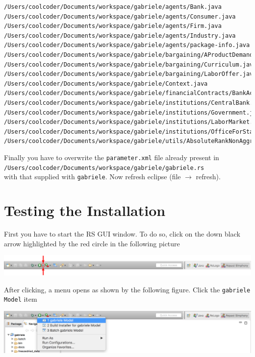 \documentclass{book}
\begin{document}
\begin{verbatim}
/Users/coolcoder/Documents/workspace/gabriele/agents/Bank.java
/Users/coolcoder/Documents/workspace/gabriele/agents/Consumer.java
/Users/coolcoder/Documents/workspace/gabriele/agents/Firm.java
/Users/coolcoder/Documents/workspace/gabriele/agents/Industry.java
/Users/coolcoder/Documents/workspace/gabriele/agents/package-info.java
/Users/coolcoder/Documents/workspace/gabriele/bargaining/AProductDemand.java
/Users/coolcoder/Documents/workspace/gabriele/bargaining/Curriculum.java
/Users/coolcoder/Documents/workspace/gabriele/bargaining/LaborOffer.java
/Users/coolcoder/Documents/workspace/gabriele/Context.java
/Users/coolcoder/Documents/workspace/gabriele/financialContracts/BankAccount.java
/Users/coolcoder/Documents/workspace/gabriele/institutions/CentralBank.java
/Users/coolcoder/Documents/workspace/gabriele/institutions/Government.java
/Users/coolcoder/Documents/workspace/gabriele/institutions/LaborMarket.java
/Users/coolcoder/Documents/workspace/gabriele/institutions/OfficeForStatistics.java
/Users/coolcoder/Documents/workspace/gabriele/utils/AbsoluteRankNonAggregateDataSource.java
\end{verbatim}

Finally you have to overwrite the \verb+parameter.xml+ file already present in\\  
\verb+/Users/coolcoder/Documents/workspace/gabriele/gabriele.rs+\\
with that supplied with \verb+gabriele+.
\fi
Now refresh eclipse (file $\rightarrow$ refresh).



\section{Testing the Installation}


First you have to start the RS GUI window. To do so, click on the down black arrow highlighted by the red circle in the following picture

\noindent
\includegraphics[scale=0.195]{fig_gabriele_rs_execution1a}

After clicking, a menu opens as shown by the following figure. Click the \verb+gabriele Model+ item

\noindent
\includegraphics[scale=0.35]{fig_gabriele_rs_execution2}
\end{document}
